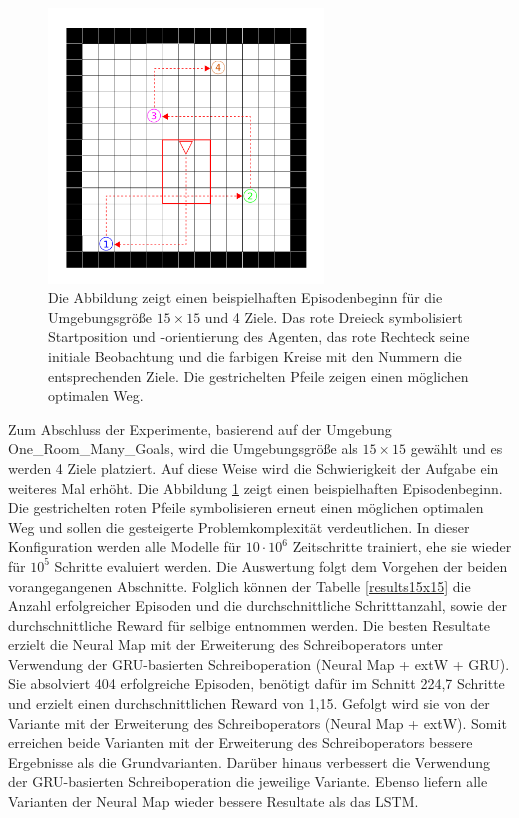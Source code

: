 \begin{figure}[ht!]
  \centering
  \includegraphics[keepaspectratio,width=0.65\textwidth]{abbildungen/15x15_ep_start.pdf}
  \caption{Die Abbildung zeigt einen beispielhaften Episodenbeginn für die Umgebungsgröße $15 \times 15$ und 4 Ziele. Das rote Dreieck symbolisiert Startposition und -orientierung des Agenten, das rote Rechteck seine initiale Beobachtung und die farbigen Kreise mit den Nummern die entsprechenden Ziele. Die gestrichelten Pfeile zeigen einen möglichen optimalen Weg.}
  \label{fig_15x15_ep_start}
\end{figure}

Zum Abschluss der Experimente, basierend auf der Umgebung \glqq One\_Room\_Many\_Goals\grqq{}, wird die Umgebungsgröße als $15 \times 15$ gewählt und es werden 4 Ziele platziert. Auf diese Weise wird die Schwierigkeit der Aufgabe ein weiteres Mal erhöht. Die Abbildung \ref{fig_15x15_ep_start} zeigt einen beispielhaften Episodenbeginn. Die gestrichelten roten Pfeile symbolisieren erneut einen möglichen optimalen Weg und sollen die gesteigerte Problemkomplexität verdeutlichen. In dieser Konfiguration werden alle Modelle für $10\cdot10^6$ Zeitschritte trainiert, ehe sie wieder für $10^5$ Schritte evaluiert werden. Die Auswertung folgt dem Vorgehen der beiden vorangegangenen Abschnitte. Folglich können der Tabelle \ref{results15x15} die Anzahl erfolgreicher Episoden und die durchschnittliche Schritttanzahl, sowie der durchschnittliche Reward für selbige entnommen werden. Die besten Resultate erzielt die Neural Map mit der Erweiterung des Schreiboperators unter Verwendung der GRU-basierten Schreiboperation (Neural Map + extW + GRU). Sie absolviert 404 erfolgreiche Episoden, benötigt dafür im Schnitt 224,7 Schritte und erzielt einen durchschnittlichen Reward von 1,15. Gefolgt wird sie von der Variante mit der Erweiterung des Schreiboperators (Neural Map + extW). Somit erreichen beide Varianten mit der Erweiterung des Schreiboperators bessere Ergebnisse als die Grundvarianten. Darüber hinaus verbessert die Verwendung der GRU-basierten Schreiboperation die jeweilige Variante. Ebenso liefern alle Varianten der Neural Map wieder bessere Resultate als das LSTM.

